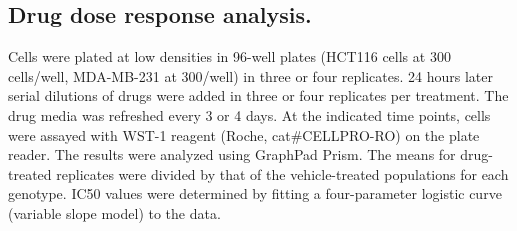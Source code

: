 \subsection{Drug dose response analysis.}
Cells were plated at low densities in 96-well plates (HCT116 cells at 300 cells/well, MDA-MB-231 at 300/well) in three or four replicates.
24 hours later  serial dilutions of drugs  were added in three or four replicates per treatment. The drug media was refreshed every 3 or 4 days. At the indicated time points, cells were assayed with WST-1 reagent (Roche, cat\#CELLPRO-RO) on the plate reader. The results were analyzed using GraphPad Prism. The means for drug-treated replicates were divided by that of the vehicle-treated populations for each genotype. IC50 values were determined by fitting a four-parameter logistic curve (variable slope model) to the data.   


